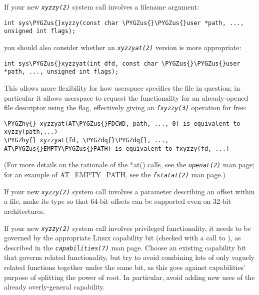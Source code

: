 \documentclass[a4paper,8pt,english]{sphinxmanual}
\def\PYGZus{\char`\_}
\def\PYGZhy{\char`\-}
\def\PYGZdq{\char`\"}
\begin{document}
If your new \emph{\texttt{xyzzy(2)}} system call involves a filename argument:

\begin{Verbatim}[commandchars=\\\{\}]
int sys\PYGZus{}xyzzy(const char \PYGZus{}\PYGZus{}user *path, ..., unsigned int flags);
\end{Verbatim}

you should also consider whether an \emph{\texttt{xyzzyat(2)}} version is more appropriate:

\begin{Verbatim}[commandchars=\\\{\}]
int sys\PYGZus{}xyzzyat(int dfd, const char \PYGZus{}\PYGZus{}user *path, ..., unsigned int flags);
\end{Verbatim}

This allows more flexibility for how userspace specifies the file in question;
in particular it allows userspace to request the functionality for an
already-opened file descriptor using the  flag, effectively
giving an \emph{\texttt{fxyzzy(3)}} operation for free:

\begin{Verbatim}[commandchars=\\\{\}]
\PYGZhy{} xyzzyat(AT\PYGZus{}FDCWD, path, ..., 0) is equivalent to xyzzy(path,...)
\PYGZhy{} xyzzyat(fd, \PYGZdq{}\PYGZdq{}, ..., AT\PYGZus{}EMPTY\PYGZus{}PATH) is equivalent to fxyzzy(fd, ...)
\end{Verbatim}

(For more details on the rationale of the *at() calls, see the
\emph{\texttt{openat(2)}} man page; for an example of AT\_EMPTY\_PATH, see the
\emph{\texttt{fstatat(2)}} man page.)

If your new \emph{\texttt{xyzzy(2)}} system call involves a parameter describing an
offset within a file, make its type  so that 64-bit offsets can be
supported even on 32-bit architectures.

If your new \emph{\texttt{xyzzy(2)}} system call involves privileged functionality,
it needs to be governed by the appropriate Linux capability bit (checked with
a call to ), as described in the \emph{\texttt{capabilities(7)}} man
page.  Choose an existing capability bit that governs related functionality,
but try to avoid combining lots of only vaguely related functions together
under the same bit, as this goes against capabilities' purpose of splitting
the power of root.  In particular, avoid adding new uses of the already
overly-general  capability.
\end{document}
